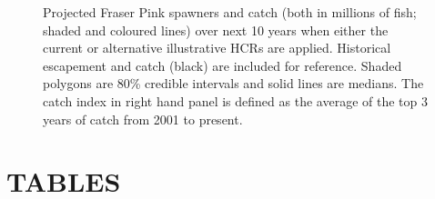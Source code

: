 \documentclass[11pt]{book}
\begin{document}
\begin{figure}[htb]

{\centering {} 

}

\caption{Projected Fraser Pink spawners and catch (both in millions of fish; shaded and coloured lines) over next 10 years when either the current or alternative illustrative HCRs are applied. Historical escapement and catch (black) are included for reference. Shaded polygons are 80\% credible intervals and solid lines are medians. The catch index in right hand panel is defined as the average of the top 3 years of catch from 2001 to present.}\label{fig:fig-fwd-SC}
\end{figure}
\clearpage

\hypertarget{tables}{%
\section{TABLES}\label{tables}}
\end{document}
